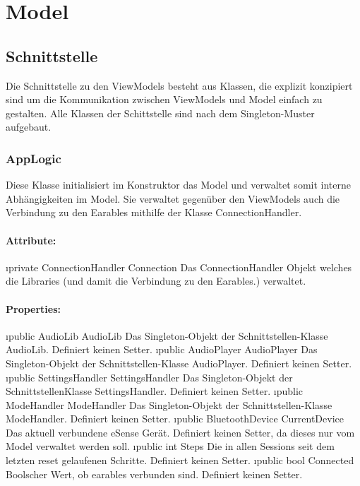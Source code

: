 \documentclass[../entwurf.tex]{subfiles}
\begin{document}
	\section{Model}
		\subsection{Schnittstelle}
			Die Schnittstelle zu den ViewModels besteht aus Klassen, die explizit konzipiert sind um die Kommunikation zwischen ViewModels und Model
			einfach zu gestalten. Alle Klassen der Schittstelle sind nach dem Singleton-Muster aufgebaut.
			\subsubsection{AppLogic}
				Diese Klasse initialisiert im Konstruktor das Model und verwaltet somit interne Abhängigkeiten im Model. Sie verwaltet gegenüber den
				ViewModels auch die Verbindung zu den Earables mithilfe der Klasse ConnectionHandler.
				\paragraph{Attribute:}
					\begin{itemize}
						\i{private ConnectionHandler Connection} Das ConnectionHandler Objekt welches die Libraries
						(und damit die Verbindung zu den Earables.) verwaltet.
					\end{itemize}
				\paragraph{Properties:}
					\begin{itemize}
						\i{public AudioLib AudioLib} Das Singleton-Objekt der Schnittstellen-Klasse AudioLib. Definiert keinen Setter.
						\i{public AudioPlayer AudioPlayer} Das Singleton-Objekt der Schnittstellen-Klasse AudioPlayer. Definiert keinen Setter.
						\i{public SettingsHandler SettingsHandler} Das Singleton-Objekt der SchnittstellenKlasse SettingsHandler.
						Definiert keinen Setter.
						\i{public ModeHandler ModeHandler} Das Singleton-Objekt der Schnittstellen-Klasse ModeHandler. Definiert keinen Setter.
						\i{public BluetoothDevice CurrentDevice} Das aktuell verbundene eSense Gerät. Definiert keinen Setter, da dieses nur vom Model
						verwaltet werden soll.
						\i{public int Steps} Die in allen Sessions seit dem letzten reset gelaufenen Schritte. Definiert keinen Setter.
						\i{public bool Connected} Boolscher Wert, ob earables verbunden sind. Definiert keinen Setter.
					\end{itemize}
\end{document}
